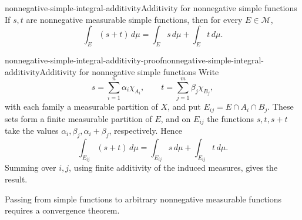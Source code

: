 \documentclass[preview]{standalone}
\begin{document}
\begin{snippetproposition}{nonnegative-simple-integral-additivity}{Additivity for nonnegative simple functions}
    If \(s,t\) are nonnegative measurable simple functions, then for every
    \(E\in\mathcal M\),
    \[
        \int_E(s+t)\,d\mu
        =\int_Es\,d\mu+\int_Et\,d\mu.
    \]
\end{snippetproposition}

\begin{snippetproof}{nonnegative-simple-integral-additivity-proof}{nonnegative-simple-integral-additivity}{Additivity for nonnegative simple functions}
    Write
    \[
        s=\sum_{i=1}^n\alpha_i\chi_{A_i},
        \qquad
        t=\sum_{j=1}^m\beta_j\chi_{B_j},
    \]
    with each family a measurable partition of \(X\), and put
    \(E_{ij}=E\cap A_i\cap B_j\). These sets form a finite measurable
    partition of \(E\), and on \(E_{ij}\) the functions \(s,t,s+t\) take the
    values \(\alpha_i,\beta_j,\alpha_i+\beta_j\), respectively. Hence
    \[
        \int_{E_{ij}}(s+t)\,d\mu
        =\int_{E_{ij}}s\,d\mu+\int_{E_{ij}}t\,d\mu.
    \]
    Summing over \(i,j\), using finite additivity of the induced measures,
    gives the result.
\end{snippetproof}

Passing from simple functions to arbitrary nonnegative measurable functions
requires a convergence theorem.
\end{document}
